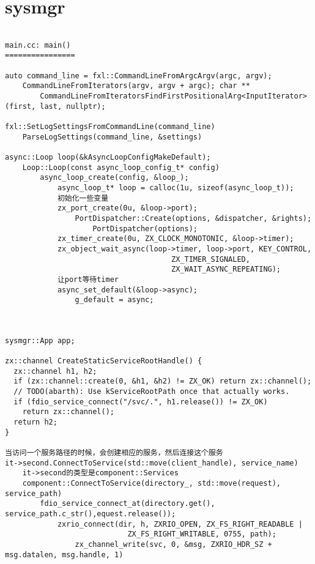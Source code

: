 \section{sysmgr}

\begin{verbatim}

main.cc: main()
================

auto command_line = fxl::CommandLineFromArgcArgv(argc, argv);
    CommandLineFromIterators(argv, argv + argc); char **
        CommandLineFromIteratorsFindFirstPositionalArg<InputIterator>(first, last, nullptr);

fxl::SetLogSettingsFromCommandLine(command_line)
    ParseLogSettings(command_line, &settings)

async::Loop loop(&kAsyncLoopConfigMakeDefault);
    Loop::Loop(const async_loop_config_t* config)
        async_loop_create(config, &loop_);
            async_loop_t* loop = calloc(1u, sizeof(async_loop_t));
            初始化一些变量
            zx_port_create(0u, &loop->port);
                PortDispatcher::Create(options, &dispatcher, &rights);
                    PortDispatcher(options);
            zx_timer_create(0u, ZX_CLOCK_MONOTONIC, &loop->timer);     
            zx_object_wait_async(loop->timer, loop->port, KEY_CONTROL,
                                      ZX_TIMER_SIGNALED,
                                      ZX_WAIT_ASYNC_REPEATING);
            让port等待timer
            async_set_default(&loop->async);
                g_default = async;



sysmgr::App app;

zx::channel CreateStaticServiceRootHandle() {
  zx::channel h1, h2;
  if (zx::channel::create(0, &h1, &h2) != ZX_OK) return zx::channel();
  // TODO(abarth): Use kServiceRootPath once that actually works.
  if (fdio_service_connect("/svc/.", h1.release()) != ZX_OK)
    return zx::channel();
  return h2;
}

当访问一个服务路径的时候，会创建相应的服务，然后连接这个服务
it->second.ConnectToService(std::move(client_handle), service_name)
    it->second的类型是component::Services
    component::ConnectToService(directory_, std::move(request), service_path)
        fdio_service_connect_at(directory.get(), service_path.c_str(),equest.release());
            zxrio_connect(dir, h, ZXRIO_OPEN, ZX_FS_RIGHT_READABLE |
                            ZX_FS_RIGHT_WRITABLE, 0755, path);
                zx_channel_write(svc, 0, &msg, ZXRIO_HDR_SZ + msg.datalen, msg.handle, 1)


\end{verbatim}
